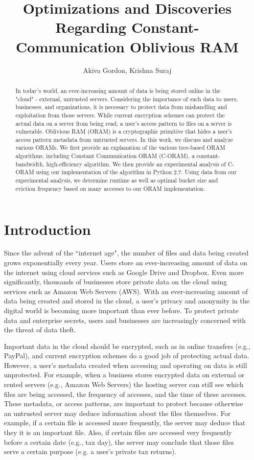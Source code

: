 \documentclass[12pt, oneside]{article}   	%
\title{Optimizations and Discoveries Regarding Constant-Communication Oblivious RAM}
\author{Akiva Gordon, Krishna Suraj}
\date{}							%
\begin{document}
\maketitle

\begin{abstract}
In today's world, an ever-increasing amount of data is being stored online in the "cloud" - external, untrusted servers. Considering the importance of such data to users, businesses, and organizations, it is necessary to protect data from mishandling and exploitation from those servers. While current encryption schemes can protect the actual data on a server from being read, a user's access pattern to files on a server is vulnerable. Oblivious RAM (ORAM) is a cryptographic primitive that hides a user's access pattern metadata from untrusted servers. In this work, we discuss and analyze various ORAMs. We first provide an explanation of the various tree-based ORAM algorithms, including Constant Communication ORAM (C-ORAM), a constant-bandwidth, high-efficiency algorithm. We then provide an experimental analysis of C-ORAM using our implementation of the algorithm in Python 2.7. Using data from our experimental analysis, we determine runtime as well as  optimal bucket size and eviction frequency based on many accesses to our ORAM implementation.

\end{abstract}


\section{Introduction}
Since the advent of the ``internet age", the number of files and data being created grows exponentially every year. Users store an ever-increasing amount of data on the internet using cloud services such as Google Drive and Dropbox. Even more significantly, thousands of businesses store private data on the cloud using services such as Amazon Web Servers (AWS). With an ever-increasing amount of data being created and stored in the cloud, a user's privacy and anonymity in the digital world is becoming more important than ever before. To protect private data and enterprise secrets, users and businesses are increasingly concerned with the threat of data theft.

Important data in the cloud should be encrypted, such as in online transfers (e.g., PayPal), and current encryption schemes do a good job of protecting actual data. However, a user's metadata created when accessing and operating on data is still unprotected. For example, when a business stores encrypted data on external or rented servers (e.g., Amazon Web Servers) the hosting server can still see which files are being accessed, the frequency of accesses, and the time of these accesses. These metadata, or access patterns, are important to protect because otherwise an untrusted server may deduce information about the files themselves. For example, if a certain file is accessed more frequently, the server may deduce that they it is an important file. Also, if certain files are accessed very frequently before a certain date (e.g., tax day), the server may conclude that those files serve a certain purpose (e.g. a user's private tax returns).
\end{document}
